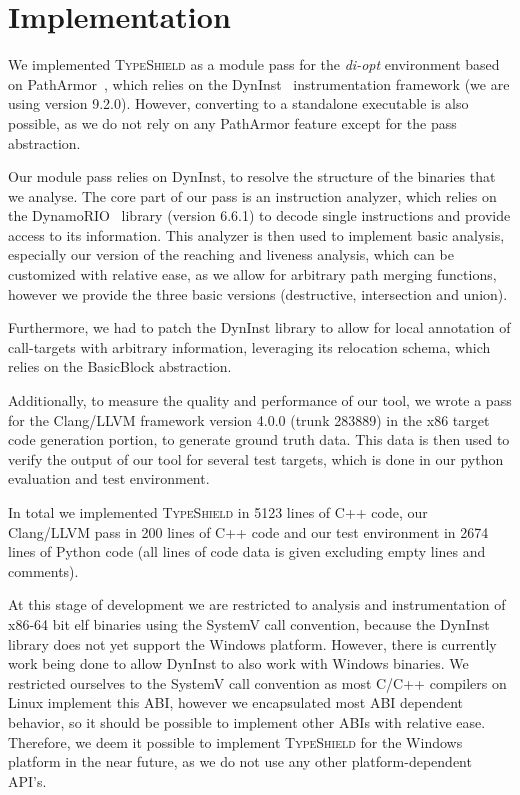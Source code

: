 \section{Implementation}
\label{chapter:Implementation}

We implemented \textsc{TypeShield} as a module pass for the \textit{di-opt} environment based on PathArmor~\cite{veen:cfi}, 
which relies on the DynInst~\cite{bernat:dyninst} instrumentation framework (we are using version 9.2.0). 
However, converting to a standalone executable is also possible, as we do not rely on any PathArmor feature
except for the pass abstraction.

Our module pass relies on DynInst, to resolve the structure of the binaries that we analyse. The core part 
of our pass is an instruction analyzer, which relies on the DynamoRIO~\cite{dynamorio:drmemory} library 
(version 6.6.1) to decode single instructions and provide access to its information. This analyzer is then
used to implement basic analysis, especially our version of the reaching and liveness analysis, which can
be customized with relative ease, as we allow for arbitrary path merging functions, however we provide 
the three basic versions (destructive, intersection and union).

Furthermore, we had to patch the DynInst library to allow for local annotation of call-targets with arbitrary
information, leveraging its relocation schema, which relies on the BasicBlock abstraction.

Additionally, to measure the quality and performance of our tool, we wrote a pass for the Clang/LLVM framework
version 4.0.0 (trunk 283889) in the x86 target code generation portion, to generate ground truth data. This
data is then used to verify the output of our tool for several test targets, which is done in our python 
evaluation and test environment.

In total we implemented \textsc{TypeShield} in 5123 lines of C++ code, our Clang/LLVM pass in 200 lines 
of C++ code and our test environment in 2674 lines of Python code (all lines of code data is given 
excluding empty lines and comments).

At this stage of development we are restricted to analysis and instrumentation of x86-64 bit elf 
binaries using the SystemV call convention, because the DynInst library does not yet support the
Windows platform. However, there is currently work being done to allow DynInst to also work with
Windows binaries. We restricted ourselves to the SystemV call convention as most C/C++ compilers
on Linux implement this ABI, however we encapsulated most ABI dependent behavior, so it should 
be possible to implement other ABIs with relative ease. Therefore, we deem it possible to implement
\textsc{TypeShield} for the Windows platform in the near future, as we do not use any other 
platform-dependent API's. 

